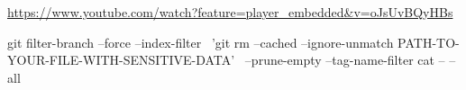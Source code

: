 \documentclass[11pt]{article}
\begin{document}
\href{https://www.youtube.com/watch?feature=player\_embedded\&v=oJsUvBQyHBs}{https://www.youtube.com/watch?feature=player\_embedded\&v=oJsUvBQyHBs}


git filter-branch --force --index-filter \
'git rm --cached --ignore-unmatch PATH-TO-YOUR-FILE-WITH-SENSITIVE-DATA' \
--prune-empty --tag-name-filter cat -- --all
\end{document}
